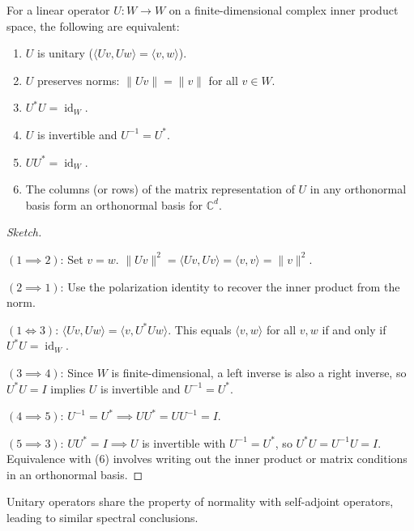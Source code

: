 \begin{proposition}
\label{prop:unitary_equiv}
For a linear operator $U: W \to W$ on a finite-dimensional complex inner product space, the following are equivalent:
\begin{enumerate}
    \item $U$ is unitary ($\langle Uv, Uw \rangle = \langle v, w \rangle$).
    \item $U$ preserves norms: $\|Uv\| = \|v\|$ for all $v \in W$.
    \item $U^*U = \operatorname{id}_W$.
    \item $U$ is invertible and $U^{-1} = U^*$.
    \item $UU^* = \operatorname{id}_W$.
    \item The columns (or rows) of the matrix representation of $U$ in any orthonormal basis form an orthonormal basis for $\mathbb{C}^d$.
\end{enumerate}
\end{proposition}
\begin{proof}[Sketch]\,

$(1 \implies 2)$: Set $v=w$. $\|Uv\|^2 = \langle Uv, Uv \rangle = \langle v, v \rangle = \|v\|^2$.

$(2 \implies 1)$: Use the polarization identity to recover the inner product from the norm.

$(1 \iff 3)$: $\langle Uv, Uw \rangle = \langle v, U^*Uw \rangle$. This equals $\langle v, w \rangle$ for all $v, w$ if and only if $U^*U = \operatorname{id}_W$.

$(3 \implies 4)$: Since $W$ is finite-dimensional, a left inverse is also a right inverse, so $U^*U=I$ implies $U$ is invertible and $U^{-1}=U^*$.

$(4 \implies 5)$: $U^{-1}=U^* \implies UU^* = U U^{-1} = I$.

$(5 \implies 3)$: $UU^*=I \implies U$ is invertible with $U^{-1}=U^*$, so $U^*U = U^{-1}U = I$.
Equivalence with (6) involves writing out the inner product or matrix conditions in an orthonormal basis.

\end{proof}

Unitary operators share the property of normality with self-adjoint operators, leading to similar spectral conclusions.

